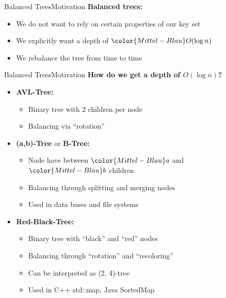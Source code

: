
\begin{frame}{Balanced Trees}{Motivation}
  \textbf{Balanced trees:}
  \begin{itemize}
    \item<2->
      We do not want to rely on certain properties of our {\color{Mittel-Blau}key set}
    \item<3->
      We explicitly want a depth of ${\color{Mittel-Blau}O(\log n)}$
    \item<4->
      We {\color{Mittel-Blau}rebalance} the tree from time to time
  \end{itemize}
\end{frame}


\begin{frame}{Balanced Trees}{Motivation}
  \textbf{How do we get a depth of {\color{Mittel-Blau}$O(\log n)$}?}
  \begin{itemize}
    \item<2->
      \textbf{AVL-Tree:}
      \begin{itemize}
        \item<3->
          Binary tree with 2 children per node
        \item<4->
          Balancing via \enquote{\color{Mittel-Blau}rotation}
      \end{itemize}
    \item<5->
      \textbf{(a,b)-Tree} or \textbf{B-Tree:}
      \begin{itemize}
        \item<6->
          Node have between ${\color{Mittel-Blau}a}$ and
          ${\color{Mittel-Blau}b}$ children
        \item<7->
          Balancing through {\color{Mittel-Blau}splitting} and
          {\color{Mittel-Blau}merging} nodes
        \item<8->
          Used in data bases and file systems
      \end{itemize}
    \item<9->
      \textbf{Red-Black-Tree:}
      \begin{itemize}
        \item<10->
          Binary tree with \enquote{black} and \enquote{red} nodes
        \item<11->
          Balancing through \enquote{\color{Mittel-Blau}rotation} and
          \enquote{\color{Mittel-Blau}recoloring}
        \item<12->
          Can be interpreted as (2, 4)-tree
        \item<13->
          Used in C++ std::map, Java SortedMap
      \end{itemize}
  \end{itemize}
\end{frame}
